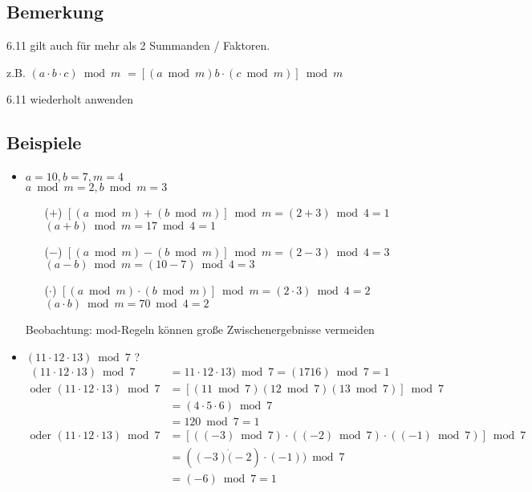 \documentclass[a4paper, 12pt, twoside] {article}
\begin{document}
 \subsection{Bemerkung} %
 6.11 gilt auch für mehr als 2 Summanden / Faktoren.

 z.B. $(a \cdot b \cdot c) \bmod m$
 $= [(a \bmod m) b \cdot (c \bmod m)] \bmod m$

 6.11 wiederholt anwenden

 \subsection{Beispiele} %
 \begin{itemize}

 \item $a = 10, b = 7, m = 4$ \\
 $ a \bmod m = 2, b \bmod m = 3$ \\

\begin{itemize}
\item[($+$)] $ [(a \bmod m) + (b \bmod m)] \bmod m = (2+3) \bmod 4 = 1$ \\
$(a + b) \bmod m = 17 \bmod 4 = 1$

\item[($-$)] $[(a \bmod m) - (b \bmod m)] \bmod m = (2 - 3) \bmod 4 = 3$ \\
$(a - b) \bmod m = (10-7) \bmod 4 = 3$

\item[($\cdot$)] $[(a \bmod m) \cdot (b \bmod m)] \bmod m = (2 \cdot 3) \bmod 4 = 2$ \\
$(a \cdot b) \bmod m = 70 \bmod 4 = 2$
\end{itemize}

Beobachtung: mod-Regeln können große Zwischenergebnisse vermeiden

 \item $(11 \cdot 12 \cdot 13) \bmod 7$ ? \\
 $\begin{aligned}
 (11 \cdot 12 \cdot 13) \bmod 7 &= 11 \cdot 12 \cdot 13) \bmod 7 = (1716) \bmod 7 = 1 \\
 \text{oder } (11 \cdot 12 \cdot 13) \bmod 7 &= [(11 \bmod 7)(12 \bmod 7) (13 \bmod 7)] \bmod 7 \\
 &= (4 \cdot 5 \cdot 6) \bmod 7 \\
 &= 120 \bmod 7 = 1 \\
 \text{oder } (11 \cdot 12 \cdot 13) \bmod 7 &= [((-3) \bmod 7) \cdot ((-2) \bmod 7) \cdot ((-1) \bmod 7)] \bmod 7 \\
 &= ((-3) \dot (-2) \cdot (-1)) \bmod 7 \\
 &= (-6) \bmod 7 = 1
 \end{aligned}$


\end{itemize}
\end{document}
